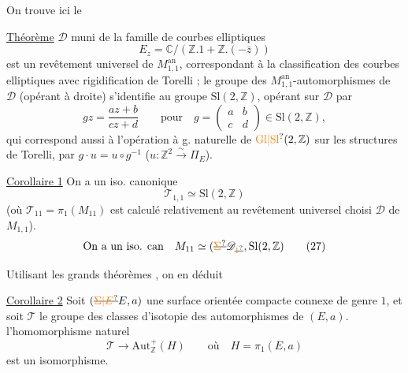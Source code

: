 
On trouve ici le

\uline{Théorème} \quad $\mathscr D$  muni de la famille  de courbes elliptiques 
\[
 E_z=\mathbb C/(\mathbb Z.1+\mathbb Z.(-\bar z))
\]
est un revêtement universel de $M_{1,1}^{\mathrm{an}}$, correspondant à la classification des courbes elliptiques avec rigidification de Torelli ; le groupe des $M_{1,1}^{\mathrm{an}}$-automorphismes de $\mathscr D$ (opérant à droite) s'identifie au groupe $\mathrm{Sl}(2,\mathbb Z)$, opérant sur $\mathscr D$ par
\[
 gz=\frac{az+b}{cz+d}\qquad\text{pour}\quad g=\begin{pmatrix}a&b\\c&d\end{pmatrix}\in\mathrm{Sl}(2,\mathbb Z),
\]
qui correspond aussi à l'opération à g. naturelle
de $\unsure{\mathrm{Gl}|\mathrm{Sl}}(2,\mathbb Z)$ sur les structures de Torelli, par $g\cdot u=u\circ g^{-1}$ ($u\colon\mathbb Z^2\xrightarrow{\sim}\Pi_E$).

\uline{Corollaire 1} On a un iso. canonique
\[
 \mathscr T_{1,1}\simeq\mathrm{Sl}(2,\mathbb Z) \tag*{(26)}
\]
(où $\mathscr T_{11}=\pi_1(M_{11})$ est calculé relativement au revêtement universel choisi $\mathscr D$ de $M_{1,1}$).
\[
 \text{On a un iso. can}\quad M_{11}\simeq(\deleted{\unsure{\Sigma}}\mathscr D_{\deleted{\unsure{1}}},\mathrm{Sl}(2,\mathbb Z) \tag*{(27)}
\]

Utilisant les grands théorèmes , on en déduit

\uline{Corollaire 2} Soit $(\deleted{\unsure{\Sigma|E}}E,a)$ une surface  orientée compacte connexe de genre $1$, et soit $\mathscr T$ le groupe des classes d'isotopie des automorphismes de $(E,a)$.   l'homomorphisme naturel
\[
 \mathscr T\longrightarrow\mathrm{Aut}_{\mathbb Z}^{+}(H)\qquad\text{où}\quad H=\pi_1(E,a) \tag*{(27)}
\]
est un isomorphisme. 

